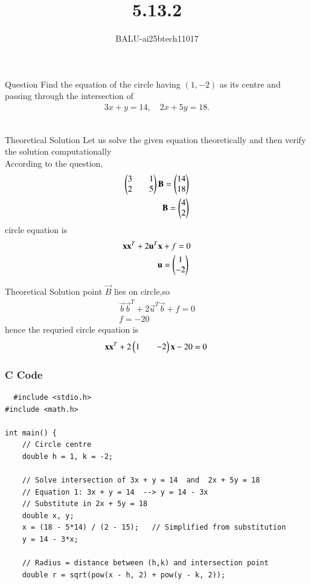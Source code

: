 \documentclass{beamer}
\title %
{5.13.2}
\author %
{BALU-ai25btech11017}
\begin{document}
\frame{\titlepage}
\begin{frame}{Question}
Find the equation of the circle having $(1,-2)$ as its centre and passing through the intersection of 
\begin{align}
3x + y = 14, \quad 2x + 5y = 18.
\end{align}
\\ 
\end{frame}
\begin{frame}{Theoretical Solution}
Let us solve the given equation theoretically and then verify the solution computationally \\
According to the question, \\
\begin{align}
   \begin{pmatrix}3&&1\\2&&5\end{pmatrix}\mathbf{B}=\begin{pmatrix}14\\18\end{pmatrix}\\
   \mathbf{B}=\begin{pmatrix}4\\2\end{pmatrix}
\end{align}
circle equation is\\
\begin{align}
   \mathbf{x}\mathbf{x}^T+2\mathbf{u}^T\mathbf{x}+f=0\\
   \mathbf{u}=\begin{pmatrix}1\\-2\end{pmatrix}\
\end{align}
\end{frame}
\begin{frame}{Theoretical Solution}
point $\vec{B}$ lies on circle,so
\begin{align}
    \vec{b}\vec{b}^T+2\vec{u}^T\vec{b}+f=0\\
    f=-20\
\end{align}
hence the requried circle equation is
\begin{align}
    \mathbf{x}\mathbf{x}^T+2\begin{pmatrix}1&&-2\end{pmatrix}\mathbf{x}-20=0\
\end{align}
\end{frame}
\begin{frame}[fragile]
    \frametitle{C Code}

    \begin{lstlisting}
  #include <stdio.h>
#include <math.h>

int main() {
    // Circle centre
    double h = 1, k = -2;

    // Solve intersection of 3x + y = 14  and  2x + 5y = 18
    // Equation 1: 3x + y = 14  --> y = 14 - 3x
    // Substitute in 2x + 5y = 18
    double x, y;
    x = (18 - 5*14) / (2 - 15);   // Simplified from substitution
    y = 14 - 3*x;

    // Radius = distance between (h,k) and intersection point
    double r = sqrt(pow(x - h, 2) + pow(y - k, 2));

  

    \end{lstlisting}
\end{frame}
\end{document}
